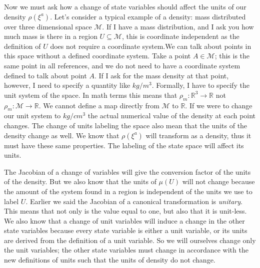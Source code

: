 \documentclass{article}
\begin{document}
	Now we must ask how a change of state variables should affect the units of our density $\rho(\xi^a)$. Let's consider a typical example of a density: mass distributed over three dimensional space $\mathcal{M}$. If I have a mass distribution, and I ask you how much mass is there in a region $U \subseteq \mathcal{M}$, this is coordinate independent as the definition of $U$ does not require a coordinate system.We can talk about points in this space without a defined coordinate system. Take a point $A \in \mathcal{M}$; this is the same point in all references, and we do not need to have a coordinate system defined to talk about point $A$. If I ask for the mass density at that point, however, I need to specify a quantity like $kg/m^3$. Formally, I have to specify the unit system of the space. In math terms this means that $\rho_m : \mathbb{R}^3 \to \mathbb{R}$ not $\rho_m : \mathcal{M} \to \mathbb{R}$. We cannot define a map directly from $\mathcal{M}$ to $\mathbb{R}$. If we were to change our unit system to $kg/cm^3$ the actual numerical value of the density at each point changes. The change of units labeling the space also mean that the units of the density change as well. We know that $\rho(\xi^a)$ will transform as a density, thus it must have these same properties. The labeling of the state space will affect its units. 
	
	The Jacobian of a change of variables will give the conversion factor of the units of the density. But we also know that the units of $\mu(U)$ will not change because the amount of the system found in a region is independent of the units we use to label $U$. Earlier we said the Jacobian of a canonical transformation is \textit{unitary}. This means that not only is the value equal to one, but also that it is unit-less. We also know that a change of unit variables will induce a change in the other state variables because every state variable is either a unit variable, or its units are derived from the definition of a unit variable. So we will ourselves change only the unit variables; the other state variables must change in accordance with the new definitions of units such that the units of density do not change.
	
\end{document}
